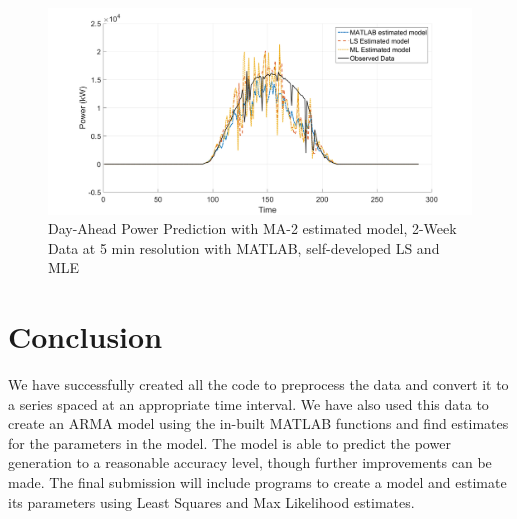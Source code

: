 \documentclass[journal]{IEEEtran}
\begin{document}
\begin{figure}[htpb]
	\centering
	\includegraphics[scale=0.2]{MA_methods_plot.png}
	\caption{Day-Ahead Power Prediction with MA-2 estimated model, 2-Week Data at 5 min resolution with MATLAB, self-developed LS and MLE}
	\label{fig17} %
\end{figure}

\section{Conclusion}
We have successfully created all the code to preprocess the data and convert it to a series spaced at an appropriate time interval. We have also used this data to create an ARMA model using the in-built MATLAB functions and find estimates for the parameters in the model. The model is able to predict the power generation to a reasonable accuracy level, though further improvements can be made. The final submission will include programs to create a model and estimate its parameters using Least Squares and Max Likelihood estimates.









\ifCLASSOPTIONcaptionsoff
  \newpage
\fi




\end{document}
